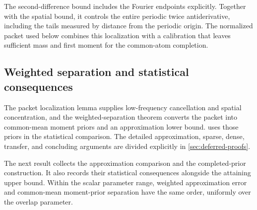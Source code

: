 The second-difference bound includes the Fourier endpoints explicitly. Together with the spatial bound, it controls the entire periodic twice antiderivative, including the tails measured by distance from the periodic origin. The normalized packet used below combines this localization with a calibration that leaves sufficient mass and first moment for the common-atom completion.

\subsection{Weighted separation and statistical consequences}

The packet localization lemma supplies low-frequency cancellation and spatial concentration, and the weighted-separation theorem converts the packet into common-mean moment priors and an approximation lower bound.  uses those priors in the statistical comparison. The detailed approximation, sparse, dense, transfer, and concluding arguments are divided explicitly in \cref{sec:deferred-proofs}.

The next result collects the approximation comparison and the completed-prior construction. It also records their statistical consequences alongside the attaining upper bound. Within the scalar parameter range, weighted approximation error and common-mean moment-prior separation have the same order, uniformly over the overlap parameter.

